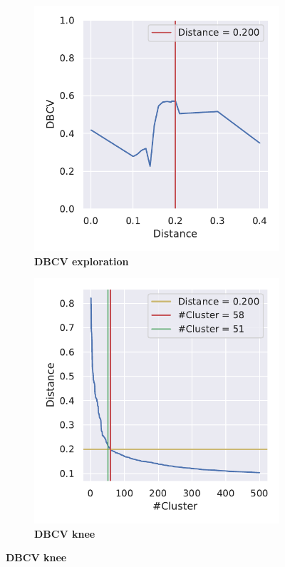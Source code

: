 \begin{figure}[!hbt]
    \centering
    \begin{subfigure}[b]{0.475\textwidth}
        \caption[DBCV exploration]{\textbf{DBCV exploration}}
        \label{subfig:PCA_Cluster_DBCV_Explo_4}            \includegraphics[width=\textwidth]{PCA/Cluster_DBCV_Segment_4.pdf}
    \end{subfigure}
    \hfill
    \begin{subfigure}[b]{0.475\textwidth}
        \caption[DBCV knee]{\textbf{DBCV knee}}
        \label{subfig:PCA_Cluster_DBCV_Elbow_4}            \includegraphics[width=\textwidth]{PCA/Cluster_Elbow_DBCV_Segment_4.pdf}

\end{subfigure}
\end{figure}
